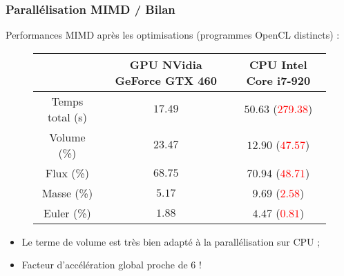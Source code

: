 \begin{frame}
\frametitle{Parallélisation MIMD / Bilan}
\vfill
Performances MIMD après les optimisations (programmes OpenCL distincts) :
\begin{figure}
	\centering
		\begin{tabular}{|c|c|c|}
			\hline
			& GPU NVidia GeForce GTX 460 & CPU Intel Core i7-920 \\ \hline\hline
			Temps total (s) & $17.49$ & $50.63$ (\textcolor{red}{$279.38$}) \\	\hline
			Volume (\%) & $23.47$ & $12.90$ (\textcolor{red}{$47.57$}) \\	\hline
			Flux (\%) & $68.75$ & $70.94$ (\textcolor{red}{$48.71$}) \\	\hline
			Masse (\%) & $5.17$ & $9.69$ (\textcolor{red}{$2.58$}) \\	\hline
			Euler (\%) & $1.88$ & $4.47$ (\textcolor{red}{$0.81$}) \\	\hline
		\end{tabular}
\end{figure}
\vfill
\begin{itemize}
\item Le terme de volume est très bien adapté à la parallélisation sur CPU ;
\item Facteur d'accélération global proche de 6 !
\end{itemize}
\vfill
\end{frame}

